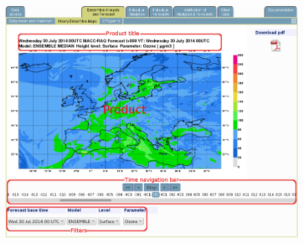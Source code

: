 \documentclass[9pt]{report}
\begin{document}
\begin{figure}[h!]%
\begin{mdcenter}%

\noindent{}\includegraphics[keepaspectratio=true,width=\dimmin{}{\dimwidth{0.90}}]{images/regional_map_details}{}%

\mdhr{}%

\noindent{}%
\end{mdcenter}\label{regional-map-details}%
\end{figure}%
\end{document}
